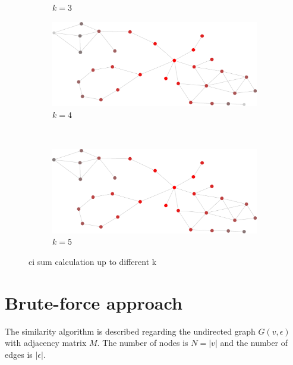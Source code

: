 \documentclass[12pt]{report}
\begin{document}
\begin{figure}[tpb]
\begin{subfigure}[b]{0.5\textwidth}
    \caption{$k=3$}
  \end{subfigure}
  \begin{subfigure}[b]{0.5\textwidth}
    \includegraphics[width=\textwidth]{frame4}
		\caption{$k=4$}
  \end{subfigure}%
  ~
  \begin{subfigure}[b]{0.5\textwidth}
    \includegraphics[width=\textwidth]{frame5}
    \caption{$k=5$}
  \end{subfigure}


  \caption{ci sum calculation up to different k}
  \label{fig:ci_diffusion}
\end{figure}

%
%
\section{Brute-force approach}
%
The similarity algorithm is described regarding the undirected graph $G(v, \epsilon)$
with adjacency matrix $M$. The number of nodes is $N = |v|$ and the number of
edges is $|\epsilon|$.
\end{document}
